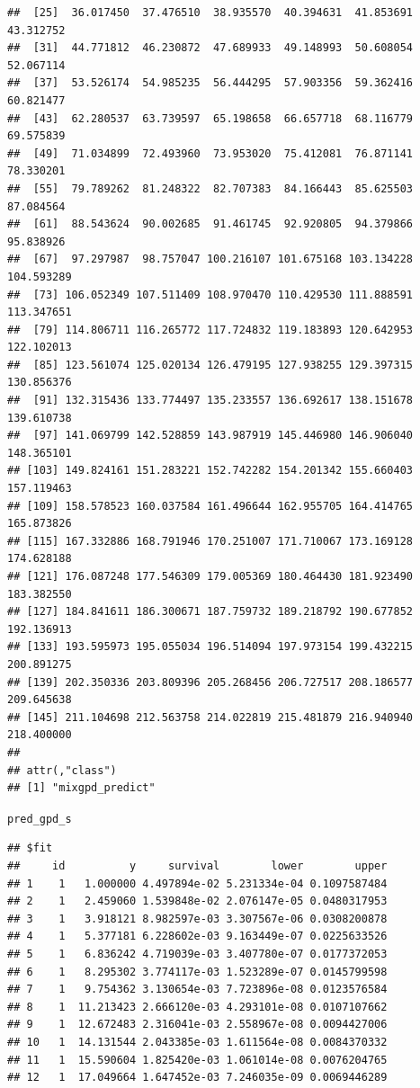\documentclass[article]{jss}\usepackage[]{graphicx}\usepackage[]{xcolor}
\makeatletter
\newcommand{\hldef}[1]{\textcolor[rgb]{0.345,0.345,0.345}{#1}}%
\newenvironment{kframe}{%
 \def\at@end@of@kframe{}%
 \ifinner\ifhmode%
  \def\at@end@of@kframe{\end{minipage}}%
  \begin{minipage}{\columnwidth}%
 \fi\fi%
 \def\FrameCommand##1{\hskip\@totalleftmargin \hskip-\fboxsep
 \colorbox{shadecolor}{##1}\hskip-\fboxsep
     \hskip-\linewidth \hskip-\@totalleftmargin \hskip\columnwidth}%
 \MakeFramed {\advance\hsize-\width
   \@totalleftmargin\z@ \linewidth\hsize
   \@setminipage}}%
 {\par\unskip\endMakeFramed%
 \at@end@of@kframe}
\newenvironment{knitrout}{}{} %
\makeatother
\begin{document}
\begin{knitrout}
\begin{kframe}
\begin{verbatim}
##  [25]  36.017450  37.476510  38.935570  40.394631  41.853691  43.312752
##  [31]  44.771812  46.230872  47.689933  49.148993  50.608054  52.067114
##  [37]  53.526174  54.985235  56.444295  57.903356  59.362416  60.821477
##  [43]  62.280537  63.739597  65.198658  66.657718  68.116779  69.575839
##  [49]  71.034899  72.493960  73.953020  75.412081  76.871141  78.330201
##  [55]  79.789262  81.248322  82.707383  84.166443  85.625503  87.084564
##  [61]  88.543624  90.002685  91.461745  92.920805  94.379866  95.838926
##  [67]  97.297987  98.757047 100.216107 101.675168 103.134228 104.593289
##  [73] 106.052349 107.511409 108.970470 110.429530 111.888591 113.347651
##  [79] 114.806711 116.265772 117.724832 119.183893 120.642953 122.102013
##  [85] 123.561074 125.020134 126.479195 127.938255 129.397315 130.856376
##  [91] 132.315436 133.774497 135.233557 136.692617 138.151678 139.610738
##  [97] 141.069799 142.528859 143.987919 145.446980 146.906040 148.365101
## [103] 149.824161 151.283221 152.742282 154.201342 155.660403 157.119463
## [109] 158.578523 160.037584 161.496644 162.955705 164.414765 165.873826
## [115] 167.332886 168.791946 170.251007 171.710067 173.169128 174.628188
## [121] 176.087248 177.546309 179.005369 180.464430 181.923490 183.382550
## [127] 184.841611 186.300671 187.759732 189.218792 190.677852 192.136913
## [133] 193.595973 195.055034 196.514094 197.973154 199.432215 200.891275
## [139] 202.350336 203.809396 205.268456 206.727517 208.186577 209.645638
## [145] 211.104698 212.563758 214.022819 215.481879 216.940940 218.400000
## 
## attr(,"class")
## [1] "mixgpd_predict"
\end{verbatim}
\begin{alltt}
\hldef{pred_gpd_s}
\end{alltt}
\begin{verbatim}
## $fit
##     id          y     survival        lower        upper
## 1    1   1.000000 4.497894e-02 5.231334e-04 0.1097587484
## 2    1   2.459060 1.539848e-02 2.076147e-05 0.0480317953
## 3    1   3.918121 8.982597e-03 3.307567e-06 0.0308200878
## 4    1   5.377181 6.228602e-03 9.163449e-07 0.0225633526
## 5    1   6.836242 4.719039e-03 3.407780e-07 0.0177372053
## 6    1   8.295302 3.774117e-03 1.523289e-07 0.0145799598
## 7    1   9.754362 3.130654e-03 7.723896e-08 0.0123576584
## 8    1  11.213423 2.666120e-03 4.293101e-08 0.0107107662
## 9    1  12.672483 2.316041e-03 2.558967e-08 0.0094427006
## 10   1  14.131544 2.043385e-03 1.611564e-08 0.0084370332
## 11   1  15.590604 1.825420e-03 1.061014e-08 0.0076204765
## 12   1  17.049664 1.647452e-03 7.246035e-09 0.0069446289

\end{verbatim}
\end{kframe}
\end{knitrout}
\end{document}
